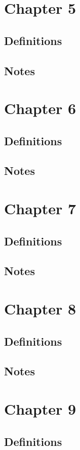 \documentclass[12pt]{article}
\begin{document}
\section{Chapter 5}
\subsection{Definitions}
\subsection{Notes}

\section{Chapter 6}
\subsection{Definitions}
\subsection{Notes}

\section{Chapter 7}
\subsection{Definitions}
\subsection{Notes}

\section{Chapter 8}
\subsection{Definitions}
\subsection{Notes}

\section{Chapter 9}
\subsection{Definitions}
\end{document}
